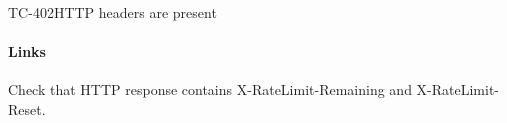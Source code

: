 \begin{testcase}{TC-402}{HTTP headers are present}
\paragraph{Links} 
Check that HTTP response contains X-RateLimit-Remaining and X-RateLimit-Reset.
\end{testcase}
